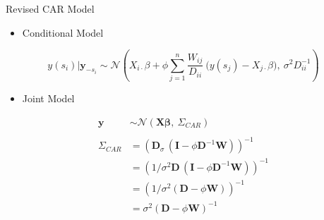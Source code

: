\documentclass[11pt,ignorenonframetext,]{beamer}
\providecommand{\tightlist}{%
  \setlength{\itemsep}{0pt}\setlength{\parskip}{0pt}}
\begin{document}
\begin{frame}[t]{Revised CAR Model}

\begin{itemize}
\tightlist
\item
  Conditional Model
\end{itemize}

\[ y(s_i)|\bm{y}_{-s_i} \sim \mathcal{N}\left(X_{i\cdot}\beta + \phi\sum_{j=1}^n \frac{W_{ij}}{D_{ii}} ~ \big(y(s_j)-X_{j\cdot}\beta\big),~ \sigma^2 D^{-1}_{ii} \right) \]

\vspace{6mm}

\begin{itemize}
\tightlist
\item
  Joint Model
\end{itemize}

\[ \begin{aligned}
\bm{y} &\sim \mathcal{N}(\bm{X}\bm{\beta},~\Sigma_{CAR}) \\
\\
\Sigma_{CAR}
  &= (\bm{D}_{\sigma} \, (\bm{I}-\phi \bm{D}^{-1}\bm{W}))^{-1} \\
  &= (1/\sigma^2 \bm{D} \, (\bm{I}-\phi \bm{D}^{-1}\bm{W}))^{-1} \\
  &= (1/\sigma^2 (\bm{D}-\phi \bm{W}))^{-1} \\
  &= \sigma^2(\bm{D}-\phi \bm{W})^{-1}
\end{aligned}
\]

\end{frame}
\end{document}
